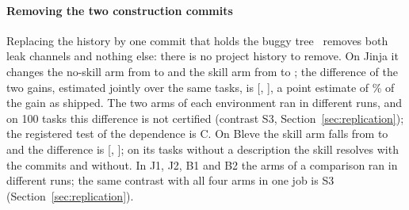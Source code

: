 \documentclass[sigconf,review,anonymous]{acmart}
\begin{document}
\paragraph{Removing the two construction commits}
Replacing the history by one commit that holds the buggy tree~\cite{debuggym_swesmith_git_fix}
removes both leak channels and nothing else: there is no project history to remove. On Jinja it
changes the no-skill arm from \njinjaNone{} to \njinjaLFNone{} and the skill arm from \njinjaSkill{}
to \njinjaLFSkill{}; the difference of the two gains, estimated jointly over the same tasks, is
\nleak{} [\nleakLo{}, \nleakHi{}], a point estimate of \nleakSharePct\% of the gain as shipped. The
two arms of each environment ran in different runs, and on 100 tasks this difference is not
certified (contrast S3, Section~\ref{sec:replication}); the registered test of the dependence is C. On Bleve the skill
arm falls from \nbleveSkill{} to \nbleveLFSkill{} and the difference is \nbleveLeak{}
[\nbleveLeakLo{}, \nbleveLeakHi{}]; on its \nbleveNoPSN{} tasks without a description the skill
resolves \nbleveNoPS{} with the commits and \nbleveNoPSLF{} without. In J1, J2, B1 and B2 the arms
of a comparison ran in different runs; the same contrast with all four arms in one job is S3
(Section~\ref{sec:replication}).
\end{document}

